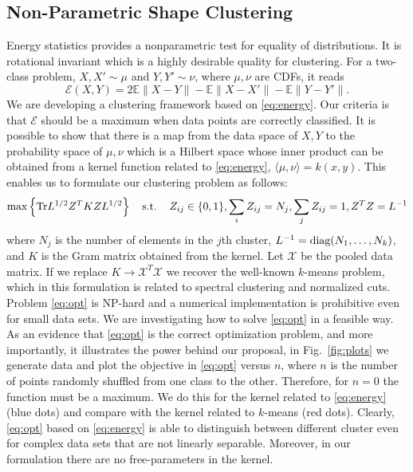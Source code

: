 \documentclass[simplex.tex]{subfiles}
\begin{document}
\subsection{Non-Parametric Shape Clustering}

Energy statistics provides a nonparametric test for equality of distributions.
It is rotational invariant which is a highly desirable quality
for clustering. For a two-class problem, $X,X' \sim \mu$ and 
$Y,Y' \sim \nu$, where $\mu,\nu$ are CDFs, it reads
\begin{equation}\label{eq:energy}
\mathcal{E}(X,Y) = 2\mathbb{E} \| X - Y \|
- \mathbb{E} \| X - X' \| - \mathbb{E} \| Y - Y'\|.
\end{equation}
We are developing a clustering framework based on \ref{eq:energy}.
Our criteria is that $\mathcal{E}$ should be a maximum when data points are
correctly classified.
%
It is possible to show that there is a map from the data space of $X,Y$
to the probability space of $\mu,\nu$ which is a Hilbert space whose
inner product  can be obtained from a kernel 
function related to \ref{eq:energy}, 
$\langle \mu, \nu \rangle
= k(x,y)$.
This enables us to formulate our clustering problem as follows:
\begin{equation}\label{eq:opt}
\textnormal{max} \left\{ \textnormal{Tr} L^{1/2} Z^T K Z L^{1/2} \right\}
\quad
\textnormal{s.t.} \quad 
\, Z_{ij}\in\{0,1\}, \sum_i Z_{ij} = N_j, \sum_j Z_{ij}=1,
Z^T Z = L^{-1}
\end{equation}
where $N_j$ is the number of elements in the $j$th cluster,
$L^{-1}=\textnormal{diag}(N_1,\dotsc,N_k)$, and $K$ is the Gram 
matrix obtained
from the kernel. Let $\mathcal{X}$ be the pooled data matrix. If we
replace $K \to \mathcal{X}^T \mathcal{X}$ we recover the well-known
$k$-means problem, which in this formulation is related
to spectral clustering and normalized cuts. Problem
\ref{eq:opt} is 
NP-hard and a numerical implementation is prohibitive even
for small data sets. We are investigating how to 
solve \ref{eq:opt} in
a feasible way. As an evidence that \ref{eq:opt} is the correct optimization
problem, and more importantly, it illustrates the power behind our proposal,
in Fig.~\ref{fig:plots} we generate data and plot the objective in 
\ref{eq:opt} versus $n$, where $n$ is the number of points randomly shuffled
from one class to the other. Therefore, for $n=0$ the function must be a
maximum. We do this for the kernel related to \ref{eq:energy} (blue dots)
and compare with the kernel related to $k$-means (red dots).
Clearly, \ref{eq:opt} based on \ref{eq:energy} is able to distinguish
between different cluster even for complex data sets that are
not linearly separable. Moreover, in our formulation
there are no free-parameters in the kernel.
\end{document}
